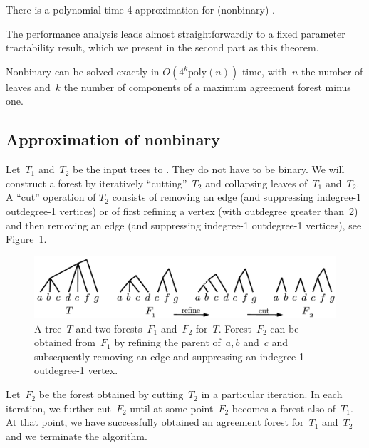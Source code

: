 \begin{theorem}\label{thm:maf}
There is a polynomial-time 4-approximation for (nonbinary) \maf.
\end{theorem}

The performance analysis leads almost straightforwardly to a fixed parameter tractability result, which we present in the second part as this theorem.

\begin{theorem}\label{thm:fpt}
Nonbinary \maf can be solved exactly in $O(4^k \text{poly}(n))$ time, with~$n$ the number of leaves and~$k$ the number of components of a maximum agreement forest minus one.
\end{theorem}

\subsection*{Approximation of nonbinary \maf}


Let~$T_1$ and~$T_2$ be the input trees to \maf. They do not have to be binary. We will construct a forest by {iteratively ``cutting''~$T_2$ and collapsing leaves of~$T_1$ and~$T_2$}. A ``cut'' operation of $T_2$ consists of removing an edge (and suppressing indegree-1 outdegree-1 vertices) or of first refining a vertex (with outdegree greater than~2) and then removing an edge (and suppressing indegree-1 outdegree-1 vertices), see Figure~\ref{fig:cut}.

\begin{figure}
\centering
\includegraphics[scale=.8]{../figs/fig_cut}
\caption{A tree~$T$ and two forests~$F_1$ and~$F_2$ for~$T$. Forest~$F_2$ can be obtained from~$F_1$ by refining the parent of~$a,b$ and~$c$ and subsequently removing an edge and suppressing an indegree-1 outdegree-1 vertex.\label{fig:cut}}
\end{figure}

Let~$F_2$ be the forest obtained by cutting~$T_2$ {in a particular iteration}. In each iteration, we further cut~$F_2$ until at some point~$F_2$ becomes a forest also of~$T_1$. At that point, we have successfully obtained an agreement forest for~$T_1$ and~$T_2$ and we terminate the algorithm.

